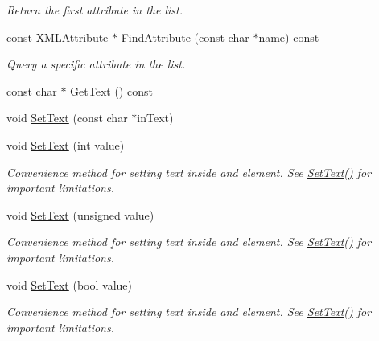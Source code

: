 \begin{DoxyCompactItemize}
\begin{DoxyCompactList}\small\item\em Return the first attribute in the list. \end{DoxyCompactList}\item 
const \hyperlink{classtinyxml2_1_1_x_m_l_attribute}{X\+M\+L\+Attribute} $\ast$ \hyperlink{classtinyxml2_1_1_x_m_l_element_aaf46b0799ea419e5d070ac9a357de48f}{Find\+Attribute} (const char $\ast$name) const 
\begin{DoxyCompactList}\small\item\em Query a specific attribute in the list. \end{DoxyCompactList}\item 
const char $\ast$ \hyperlink{classtinyxml2_1_1_x_m_l_element_a56cc727044dad002b978256754d43a4b}{Get\+Text} () const 
\item 
void \hyperlink{classtinyxml2_1_1_x_m_l_element_a1f9c2cd61b72af5ae708d37b7ad283ce}{Set\+Text} (const char $\ast$in\+Text)
\item 
void \hyperlink{classtinyxml2_1_1_x_m_l_element_aeae8917b5ea6060b3c08d4e3d8d632d7}{Set\+Text} (int value)
\begin{DoxyCompactList}\small\item\em Convenience method for setting text inside and element. See \hyperlink{classtinyxml2_1_1_x_m_l_element_a1f9c2cd61b72af5ae708d37b7ad283ce}{Set\+Text()} for important limitations. \end{DoxyCompactList}\item 
void \hyperlink{classtinyxml2_1_1_x_m_l_element_a7bbfcc11d516598bc924a8fba4d08597}{Set\+Text} (unsigned value)
\begin{DoxyCompactList}\small\item\em Convenience method for setting text inside and element. See \hyperlink{classtinyxml2_1_1_x_m_l_element_a1f9c2cd61b72af5ae708d37b7ad283ce}{Set\+Text()} for important limitations. \end{DoxyCompactList}\item 
void \hyperlink{classtinyxml2_1_1_x_m_l_element_ae4b543d6770de76fb6ab68e541c192a4}{Set\+Text} (bool value)
\begin{DoxyCompactList}\small\item\em Convenience method for setting text inside and element. See \hyperlink{classtinyxml2_1_1_x_m_l_element_a1f9c2cd61b72af5ae708d37b7ad283ce}{Set\+Text()} for important limitations. \end{DoxyCompactList}\item 

\end{DoxyCompactItemize}
